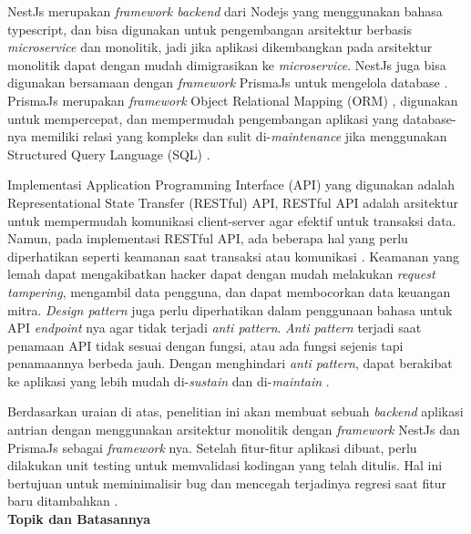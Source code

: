 NestJs merupakan \textit{framework backend} dari Nodejs yang menggunakan bahasa typescript, dan bisa digunakan untuk pengembangan arsitektur berbasis \textit{microservice} dan monolitik, jadi jika aplikasi dikembangkan pada arsitektur monolitik dapat dengan mudah dimigrasikan ke \textit{microservice}. NestJs juga bisa digunakan bersamaan dengan \textit{framework} PrismaJs untuk mengelola database \cite{NestJS}. PrismaJs merupakan \textit{framework} Object Relational Mapping (ORM) \cite{Prisma}, digunakan untuk mempercepat, dan mempermudah pengembangan aplikasi yang database-nya memiliki relasi yang kompleks dan sulit di-\textit{maintenance} jika menggunakan Structured Query Language (SQL) \cite{Zmaranda2020}.

Implementasi Application Programming Interface (API) yang digunakan adalah Representational State Transfer (RESTful) API, RESTful API adalah arsitektur untuk mempermudah komunikasi client-server agar efektif untuk transaksi data. Namun, pada implementasi RESTful API, ada beberapa hal yang perlu diperhatikan seperti keamanan saat transaksi  atau komunikasi \cite{Beer2018}. Keamanan yang lemah dapat mengakibatkan hacker dapat dengan mudah melakukan \textit{request tampering}, mengambil data pengguna, dan dapat membocorkan data keuangan mitra. \textit{Design pattern} juga perlu diperhatikan dalam penggunaan bahasa untuk API \textit{endpoint} nya agar tidak terjadi \textit{anti pattern}. \textit{Anti pattern} terjadi saat penamaan API tidak sesuai dengan fungsi, atau ada fungsi sejenis tapi penamaannya berbeda jauh. Dengan menghindari \textit{anti pattern}, dapat berakibat ke aplikasi yang lebih mudah di-\textit{sustain} dan di-\textit{maintain} \cite{Aghajani2018} \cite{Alshraiedeh2021}.

Berdasarkan uraian di atas, penelitian ini akan membuat sebuah \textit{backend} aplikasi antrian dengan menggunakan arsitektur monolitik dengan \textit{framework} NestJs dan PrismaJs sebagai \textit{framework} nya. Setelah fitur-fitur aplikasi dibuat, perlu dilakukan unit testing untuk memvalidasi kodingan yang telah ditulis. Hal ini bertujuan untuk meminimalisir bug dan mencegah terjadinya regresi saat fitur baru ditambahkan \cite{runeson2006survey}.\\

\noindent\textbf{Topik dan Batasannya}


